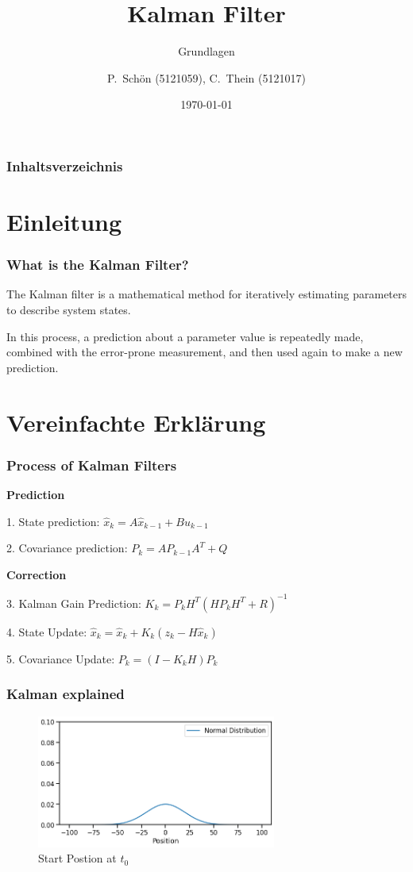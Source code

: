 \documentclass{beamer}
\title{Kalman Filter}
\subtitle{Grundlagen}
\author{P.~Schön (5121059), C.~Thein (5121017)}
\date{\today}
\begin{document}
\frame{\titlepage}

\begin{frame}
    \frametitle{Inhaltsverzeichnis}
    \tableofcontents
\end{frame}

\section{Einleitung}

\begin{frame}
    \frametitle{What is the Kalman Filter?}
    The Kalman filter is a mathematical method for iteratively estimating parameters to describe 
    system states.

    In this process, a prediction about a parameter value is repeatedly made, combined with the 
    error-prone measurement, and then used again to make a new prediction.
\end{frame}

\section{Vereinfachte Erklärung}

\begin{frame}
    \frametitle{Process of Kalman Filters}

    \textbf{Prediction}

    1. State prediction: \( \hat{x}_{k} = A\hat{x}_{k-1}+Bu_{k-1} \)

    2. Covariance prediction: \( P_{k}=AP_{k-1}A^{T}+Q \)

    \textbf{Correction}

    3. Kalman Gain Prediction: \( K_{k}=P_{k}H^{T}(HP_{k}H^T+R)^{-1} \)

    4. State Update: \( \hat{x}_{k}=\hat{x}_{k}+K_{k}(z_{k}-H\hat{x}_{k}) \)

    5. Covariance Update: \( P_{k}=(I-K_{k}H)P_{k} \)
\end{frame}


\begin{frame}
    \frametitle{Kalman explained}
    \begin{figure}
        \centering
        \includegraphics[width=0.7\textwidth]{images/01_normal_distribution.png}
        \caption{Start Postion at \(t_0\)}
    \end{figure}
\end{frame}
\end{document}
